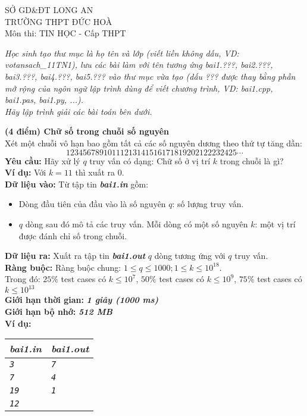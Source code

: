 \begin{name}
	{SỞ GD\&ĐT LONG AN \\ TRƯỜNG THPT ĐỨC HOÀ}
	{\testname \\ Môn thi: TIN HỌC - Cấp THPT}
\end{name}

\textit{Học sinh tạo thư mục là họ tên và lớp (viết liền không dấu, VD: votansach\_11TN1), lưu các bài làm với tên tương ứng bai1.???, bai2.???, bai3.???, bai4.???, bai5.??? vào thư mục vừa tạo (dấu ??? được thay bằng phần mở rộng của ngôn ngữ lập trình dùng để viết chương trình, VD: bai1.cpp, bai1.pas, bai1.py, ...).\\
Hãy lập trình giải các bài toán bên dưới.}

\begin{ex}
	\textbf{(4 điểm) Chữ số trong chuỗi số nguyên}\\
	Xét một chuỗi vô hạn bao gồm tất cả các số nguyên dương theo thứ tự tăng dần: 
	$$12345678910111213141516171819202122232425\cdots$$
	\textbf{Yêu cầu: }Hãy xử lý $q$ truy vấn có dạng: Chữ số ở vị trí $k$ trong chuỗi là gì?\\
	\textbf{Ví dụ: } Với $k=11$ thì xuất ra $0$.\\
	\textbf{Dữ liệu vào: } Từ tập tin \textit{\textbf{bai1.in}} gồm: 
	\begin{itemize}
		\item Dòng đầu tiên của đầu vào là số nguyên $q$: số lượng truy vấn. 
		\item $q$ dòng sau đó mô tả các truy vấn. Mỗi dòng có một số nguyên $k$: một vị trí được đánh chỉ số trong chuỗi. 
	\end{itemize}
	\textbf{Dữ liệu ra: } Xuất ra tập tin \textit{\textbf{bai1.out}} $q$ dòng tương ứng với $q$ truy vấn.\\
	\textbf{Ràng buộc: } Ràng buộc chung: $1 \leq q \leq 1000; 1 \leq k \leq 10^{18}$.\\
	 Trong đó: 
	$25\%$ test cases có $k \leq 10^7$,  $50\%$ test cases có $k \leq 10^9$,  $75\%$ test cases có $k \leq 10^{13}$\\
	\textbf{Giới hạn thời gian: } \textbf{\textit{1 giây (1000 ms)}} \\
	\textbf{Giới hạn bộ nhớ: } \textbf{\textit{512 MB}}\\
	\textbf{Ví dụ: }
	\begin{center}
		\begin{tabular}{|l|l|}
			\hline
			\textit{\textbf{\textsf{bai1.in}}} & \textit{\textbf{\textsf{bai1.out}}} \\ %
			\hline
			\textit{\texttt{3}} & \textit{\texttt{7}} \\ %
			\textit{\texttt{7}} & \textit{\texttt{4}} \\ %
			\textit{\texttt{19}} & \textit{\texttt{1}} \\ %
			\textit{\texttt{12}} &  \\ %
			\hline
		\end{tabular}
	\end{center}
\end{ex}


